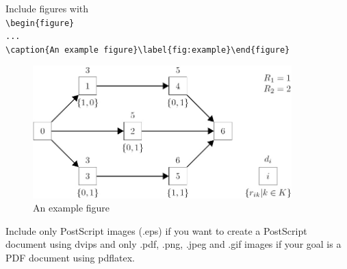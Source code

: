 Include figures with\\
\verb+\begin{figure}+\\
\verb+...+\\
\verb+\caption{An example figure}\label{fig:example}\end{figure}+

\begin{figure}[h]
\begin{center}
\includegraphics[width=10cm]{images/example_figure}
\caption{An example figure}
\label{fig:example}
\end{center}
\end{figure}

Include only PostScript images (.eps) if you want to create a PostScript document using dvips and only .pdf, .png, .jpeg and .gif images if your goal is a PDF document using pdflatex.
